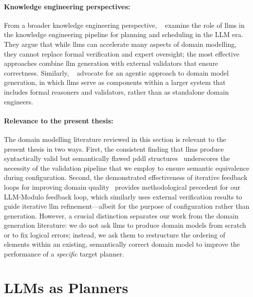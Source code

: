 \paragraph{Knowledge engineering perspectives:}
From a broader knowledge engineering perspective, \citeauthor{Vallati2025}~\cite{Vallati2025} examine the role of \glspl{llm} in the knowledge engineering pipeline for planning and scheduling in the LLM era.
They argue that while \glspl{llm} can accelerate many aspects of domain modelling, they cannot replace formal verification and expert oversight; the most effective approaches combine \gls{llm} generation with external validators that ensure correctness.
Similarly, \citeauthor{Georgievski2026}~\cite{Georgievski2026} advocate for an agentic approach to domain model generation, in which \glspl{llm} serve as components within a larger system that includes formal reasoners and validators, rather than as standalone domain engineers.

\paragraph{Relevance to the present thesis:}
The domain modelling literature reviewed in this section is relevant to the present thesis in two ways.
First, the consistent finding that \glspl{llm} produce syntactically valid but semantically flawed \gls{pddl} structures~\cite{Oswald2024, Guan2023, Huang2025} underscores the necessity of the validation pipeline that we employ to ensure semantic equivalence during configuration.
Second, the demonstrated effectiveness of iterative feedback loops for improving domain quality~\cite{Guan2023, Oswald2024, Smirnov2024, Casciani2025} provides methodological precedent for our LLM-Modulo feedback loop, which similarly uses external verification results to guide iterative \gls{llm} refinement---albeit for the purpose of configuration rather than generation.
However, a crucial distinction separates our work from the domain generation literature: we do not ask \glspl{llm} to produce domain models from scratch or to fix logical errors; instead, we ask them to restructure the ordering of elements within an existing, semantically correct domain model to improve the performance of a \emph{specific} target planner.

\section{LLMs as Planners}
\label{sec:rw:llms_as_planners}

